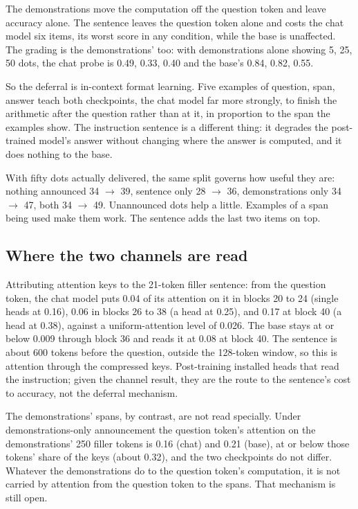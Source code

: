 \documentclass[11pt]{article}
\begin{document}
The demonstrations move the computation off the question token and leave accuracy alone. The sentence leaves the question token alone and costs the chat model six items, its worst score in any condition, while the base is unaffected. The grading is the demonstrations' too: with demonstrations alone showing 5, 25, 50 dots, the chat probe is 0.49, 0.33, 0.40 and the base's 0.84, 0.82, 0.55.

So the deferral is in-context format learning. Five examples of question, span, answer teach both checkpoints, the chat model far more strongly, to finish the arithmetic after the question rather than at it, in proportion to the span the examples show. The instruction sentence is a different thing: it degrades the post-trained model's answer without changing where the answer is computed, and it does nothing to the base.

With fifty dots actually delivered, the same split governs how useful they are: nothing announced 34 $\to$ 39, sentence only 28 $\to$ 36, demonstrations only 34 $\to$ 47, both 34 $\to$ 49. Unannounced dots help a little. Examples of a span being used make them work. The sentence adds the last two items on top.

\subsection{Where the two channels are read}

Attributing attention keys to the 21-token filler sentence: from the question token, the chat model puts 0.04 of its attention on it in blocks 20 to 24 (single heads at 0.16), 0.06 in blocks 26 to 38 (a head at 0.25), and 0.17 at block 40 (a head at 0.38), against a uniform-attention level of 0.026. The base stays at or below 0.009 through block 36 and reads it at 0.08 at block 40. The sentence is about 600 tokens before the question, outside the 128-token window, so this is attention through the compressed keys. Post-training installed heads that read the instruction; given the channel result, they are the route to the sentence's cost to accuracy, not the deferral mechanism.

The demonstrations' spans, by contrast, are not read specially. Under demonstrations-only announcement the question token's attention on the demonstrations' 250 filler tokens is 0.16 (chat) and 0.21 (base), at or below those tokens' share of the keys (about 0.32), and the two checkpoints do not differ. Whatever the demonstrations do to the question token's computation, it is not carried by attention from the question token to the spans. That mechanism is still open.
\end{document}
